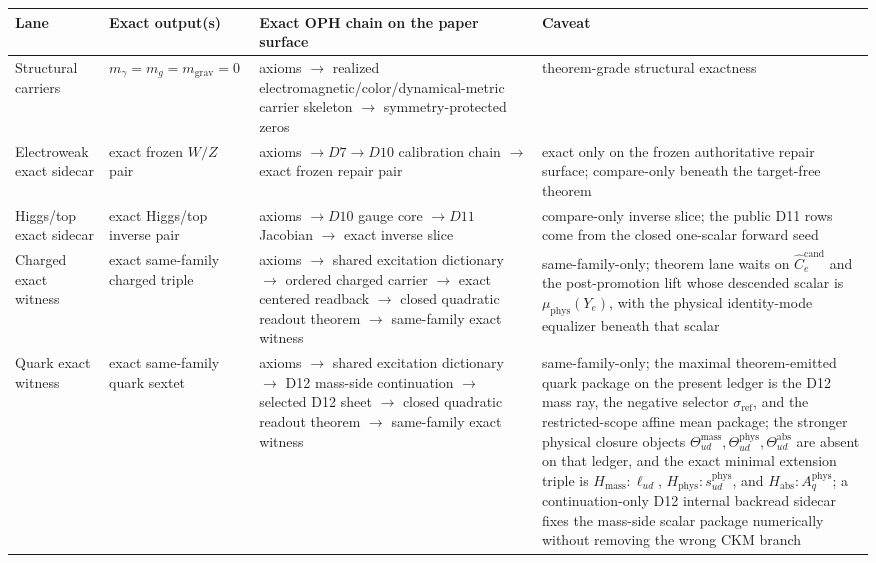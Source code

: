 \begin{table}[h]
\centering
\scriptsize
\setlength{\tabcolsep}{3pt}
\begin{tabular}{@{}>{\raggedright\arraybackslash}p{}>{\raggedright\arraybackslash}p{}>{\raggedright\arraybackslash}p{}>{\raggedright\arraybackslash}p{}@{}}
\toprule
Lane & Exact output(s) & Exact OPH chain on the paper surface & Caveat \\
\midrule
Structural carriers & \(m_\gamma=m_g=m_{\mathrm{grav}}=0\) & axioms \(\rightarrow\) realized electromagnetic/color/dynamical-metric carrier skeleton \(\rightarrow\) symmetry-protected zeros & theorem-grade structural exactness \\
Electroweak exact sidecar & exact frozen \(W/Z\) pair & axioms \(\rightarrow D7\rightarrow D10\) calibration chain \(\rightarrow\) exact frozen repair pair & exact only on the frozen authoritative repair surface; compare-only beneath the target-free theorem \\
Higgs/top exact sidecar & exact Higgs/top inverse pair & axioms \(\rightarrow D10\) gauge core \(\rightarrow D11\) Jacobian \(\rightarrow\) exact inverse slice & compare-only inverse slice; the public D11 rows come from the closed one-scalar forward seed \\
Charged exact witness & exact same-family charged triple & axioms \(\rightarrow\) shared excitation dictionary \(\rightarrow\) ordered charged carrier \(\rightarrow\) exact centered readback \(\rightarrow\) closed quadratic readout theorem \(\rightarrow\) same-family exact witness & same-family-only; theorem lane waits on \(\widehat C_e^{\mathrm{cand}}\) and the post-promotion lift whose descended scalar is \(\mu_{\mathrm{phys}}(Y_e)\), with the physical identity-mode equalizer beneath that scalar \\
Quark exact witness & exact same-family quark sextet & axioms \(\rightarrow\) shared excitation dictionary \(\rightarrow\) D12 mass-side continuation \(\rightarrow\) selected D12 sheet \(\rightarrow\) closed quadratic readout theorem \(\rightarrow\) same-family exact witness & same-family-only; the maximal theorem-emitted quark package on the present ledger is the D12 mass ray, the negative selector \(\sigma_{\mathrm{ref}}\), and the restricted-scope affine mean package; the stronger physical closure objects \(\Theta_{ud}^{\mathrm{mass}},\Theta_{ud}^{\mathrm{phys}},\Theta_{ud}^{\mathrm{abs}}\) are absent on that ledger, and the exact minimal extension triple is \(H_{\mathrm{mass}}:\ell_{ud}\), \(H_{\mathrm{phys}}:s_{ud}^{\mathrm{phys}}\), and \(H_{\mathrm{abs}}:A_q^{\mathrm{phys}}\); a continuation-only D12 internal backread sidecar fixes the mass-side scalar package numerically without removing the wrong CKM branch \\

\end{tabular}
\end{table}
